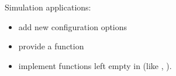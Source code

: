 Simulation applications:
\begin{itemize}
  \item{add new configuration options}
  \item{provide a  function}
  \sloppy
  \item{implement functions left empty in  (like
    , ).}
\end{itemize}


%
%
%

